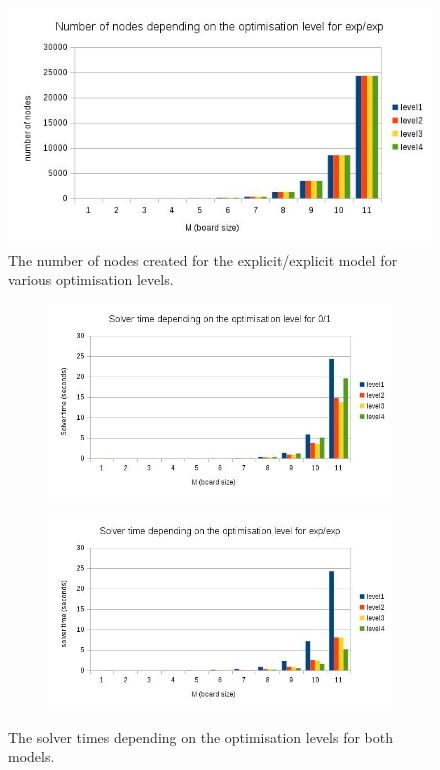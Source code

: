 \documentclass{report}
\begin{document}
\begin{figure} [\textwidth]
\includegraphics[scale=0.6]{images/optim_p1_nodes.jpg}
\caption{The number of nodes created for the explicit/explicit model for various optimisation levels.}
\end{figure}

\begin{figure}
\begin{subfigure}{.5\textwidth}
\hspace{-4cm}
\includegraphics[scale=0.47]{images/optim_p1_solverTime.jpg}
  \label{fig:sub1}
\end{subfigure}%
\begin{subfigure}{.5\textwidth}
\hspace{1cm}
\includegraphics[scale=0.47]{images/optim_p2_solverTime.jpg}
  \label{fig:sub2}
\end{subfigure}
\caption{The solver times depending on the optimisation levels for both models.}
\label{fig:test}
\end{figure}
\end{document}
